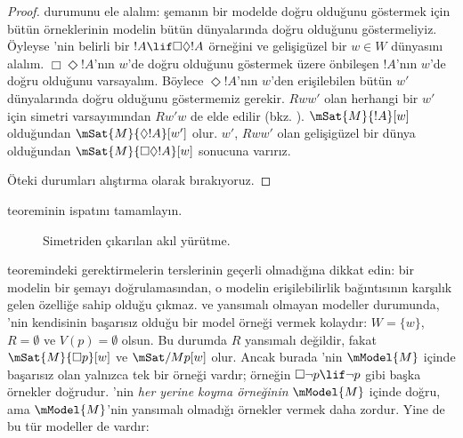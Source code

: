 \documentclass[../../../include/open-logic-section]{subfiles}
\begin{document}
\begin{proof}
   durumunu ele alalım: şemanın bir modelde doğru olduğunu göstermek
  için bütün örneklerinin modelin bütün dünyalarında doğru olduğunu
  göstermeliyiz. Öyleyse 'nin belirli bir $!A\lif\Box\Diamond !A$
  örneğini ve gelişigüzel bir $w\in W$ dünyasını alalım. $\Box\Diamond !A$'nın
  $w$'de doğru olduğunu göstermek üzere önbileşen $!A$'nın $w$'de doğru
  olduğunu varsayalım. Böylece $\Diamond !A$'nın $w$'den erişilebilen bütün
  $w'$ dünyalarında doğru olduğunu göstermemiz gerekir. $Rww'$ olan herhangi
  bir $w'$ için simetri varsayımından $Rw'w$ de elde edilir (bkz.
  ). $\mSat{M}{!A}[w]$ olduğundan
  $\mSat{M}{\Diamond !A}[w']$ olur. $w'$, $Rww'$ olan gelişigüzel bir dünya
  olduğundan $\mSat{M}{\Box\Diamond!A}[w]$ sonucuna varırız.

  Öteki durumları alıştırma olarak bırakıyoruz.
\end{proof}

\begin{prob}
   teoreminin ispatını tamamlayın.
\end{prob}

\begin{figure}
  \begin{center}
  \end{center}
\caption{Simetriden çıkarılan akıl yürütme.}
\end{figure}

 teoremindeki gerektirmelerin terslerinin geçerli
olmadığına dikkat edin: bir modelin bir şemayı doğrulamasından, o modelin
erişilebilirlik bağıntısının karşılık gelen özelliğe sahip olduğu çıkmaz.
 ve yansımalı olmayan modeller durumunda, 'nin kendisinin
başarısız olduğu bir model örneği vermek kolaydır: $W=\{w\}$,
$R=\emptyset$ ve $V(p)=\emptyset$ olsun. Bu durumda $R$ yansımalı değildir, fakat
$\mSat{M}{\Box p}[w]$ ve $\mSat/{M}{p}[w]$ olur. Ancak burada 'nin
$\mModel{M}$ içinde başarısız olan yalnızca tek bir örneği vardır; örneğin
$\Box\lnot p\lif\lnot p$ gibi başka örnekler doğrudur. 'nin
\emph{her yerine koyma örneğinin} $\mModel{M}$ içinde doğru, ama
$\mModel{M}$'nin yansımalı olmadığı örnekler vermek daha zordur. Yine de bu
tür modeller de vardır:
\end{document}
